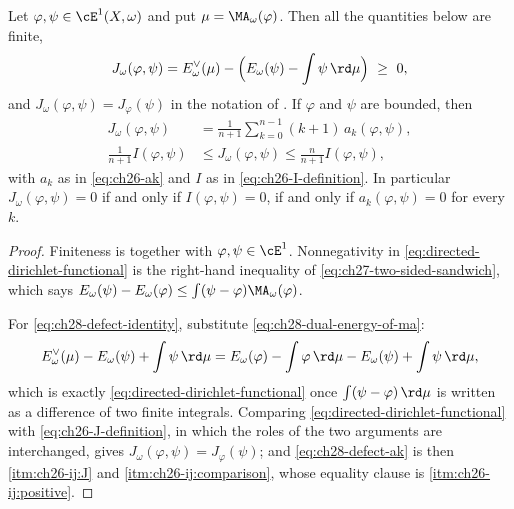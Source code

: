 \begin{proposition}
\label{prop:ch28-fenchel-defect}
Let $\varphi,\psi\in\cE^1(X,\omega)$ and put
$\mu=\MA_\omega(\varphi)$.  Then all the quantities below are finite,
\begin{equation}
\label{eq:ch28-defect-identity}
 J_\omega(\varphi,\psi)
 =E^\vee_\omega(\mu)-\Bigl(E_\omega(\psi)-\int\psi\,\rd\mu\Bigr)
 \ \geq\ 0 ,
\end{equation}
and $J_\omega(\varphi,\psi)=J_\varphi(\psi)$ in the notation of
.  If $\varphi$ and $\psi$ are bounded, then
\begin{equation}
\label{eq:ch28-defect-ak}
 \begin{aligned}
 J_\omega(\varphi,\psi)
 &=\frac1{n+1}\sum_{k=0}^{n-1}(k+1)\,a_k(\varphi,\psi),\\
 \frac1{n+1}I(\varphi,\psi)
 &\leq J_\omega(\varphi,\psi)
 \leq\frac n{n+1}I(\varphi,\psi),
 \end{aligned}
\end{equation}
with $a_k$ as in \eqref{eq:ch26-ak} and $I$ as in
\eqref{eq:ch26-I-definition}.  In particular
$J_\omega(\varphi,\psi)=0$ if and only if $I(\varphi,\psi)=0$, if and
only if $a_k(\varphi,\psi)=0$ for every $k$.
\end{proposition}

\begin{proof}
Finiteness is  together with
$\varphi,\psi\in\cE^1$.  Nonnegativity in
\eqref{eq:directed-dirichlet-functional} is the right-hand inequality of
\eqref{eq:ch27-two-sided-sandwich}, which says
$E_\omega(\psi)-E_\omega(\varphi)\leq\int(\psi-\varphi)\MA_\omega(\varphi)$.

For \eqref{eq:ch28-defect-identity}, substitute
\eqref{eq:ch28-dual-energy-of-ma}:
\[
 E^\vee_\omega(\mu)-E_\omega(\psi)+\int\psi\,\rd\mu
 =E_\omega(\varphi)-\int\varphi\,\rd\mu-E_\omega(\psi)
  +\int\psi\,\rd\mu ,
\]
which is exactly \eqref{eq:directed-dirichlet-functional} once
$\int(\psi-\varphi)\,\rd\mu$ is written as a difference of two finite
integrals.  Comparing \eqref{eq:directed-dirichlet-functional} with
\eqref{eq:ch26-J-definition}, in which the roles of the two arguments are
interchanged, gives $J_\omega(\varphi,\psi)=J_\varphi(\psi)$; and
\eqref{eq:ch28-defect-ak} is then
\,\cref{itm:ch26-ij:J} and
\cref{itm:ch26-ij:comparison}, whose equality clause is
\cref{itm:ch26-ij:positive}.
\end{proof}


